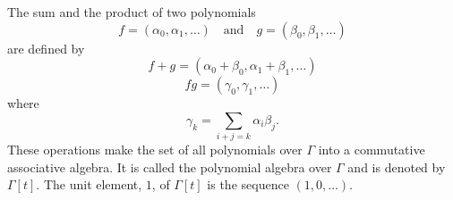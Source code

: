 The sum and the product of two polynomials
$$f = (\alpha_0, \alpha_1, \ldots) \quad \text{and} \quad g = (\beta_0, \beta_1, \ldots)$$
are defined by
$$f + g = (\alpha_0 + \beta_0, \alpha_1 + \beta_1, \ldots)$$
$$fg = (\gamma_0, \gamma_1, \ldots)$$
where
$$\gamma_k = \sum_{i+j=k} \alpha_i \beta_j.$$
These operations make the set of all polynomials over $\Gamma$ into a commutative associative algebra. It is called the polynomial algebra over $\Gamma$ and is denoted by $\Gamma[t]$. The unit element, $1$, of $\Gamma[t]$ is the sequence $(1, 0, \ldots)$.
